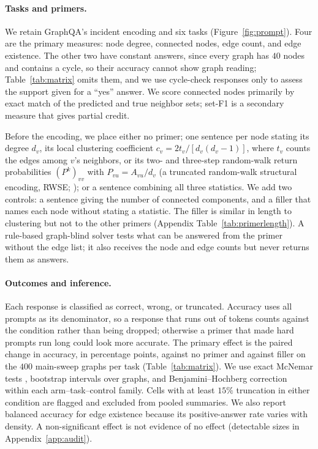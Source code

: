 \documentclass[11pt]{article}
\begin{document}
\paragraph{Tasks and primers.} We retain GraphQA's incident encoding and six tasks (Figure~\ref{fig:prompt}). Four are the primary measures: node degree, connected nodes, edge count, and edge existence. The other two have constant answers, since every graph has $40$ nodes and contains a cycle, so their accuracy cannot show graph reading; Table~\ref{tab:matrix} omits them, and we use cycle-check responses only to assess the support given for a ``yes'' answer. We score connected nodes primarily by exact match of the predicted and true neighbor sets; set-F1 is a secondary measure that gives partial credit. %

Before the encoding, we place either no primer; one sentence per node stating its degree $d_v$, its local clustering coefficient $c_v=2t_v/[d_v(d_v-1)]$, where $t_v$ counts the edges among $v$'s neighbors, or its two- and three-step random-walk return probabilities $(P^k)_{vv}$ with $P_{vu}=A_{vu}/d_v$ (a truncated random-walk structural encoding, RWSE; \citealp{dwivedi2022graph,rampasek2022recipe}); or a sentence combining all three statistics. We add two controls: a sentence giving the number of connected components, and a filler that names each node without stating a statistic. The filler is similar in length to clustering but not to the other primers (Appendix Table~\ref{tab:primerlength}). A rule-based graph-blind solver tests what can be answered from the primer without the edge list; it also receives the node and edge counts but never returns them as answers.

\paragraph{Outcomes and inference.} Each response is classified as correct, wrong, or truncated. Accuracy uses all prompts as its denominator, so a response that runs out of tokens counts against the condition rather than being dropped; otherwise a primer that made hard prompts run long could look more accurate. The primary effect is the paired change in accuracy, in percentage points, against no primer and against filler on the $400$ main-sweep graphs per task (Table~\ref{tab:matrix}). We use exact McNemar tests \citep{mcnemar1947note}, bootstrap intervals over graphs, and Benjamini--Hochberg correction \citep{benjaminihochberg1995controlling} within each arm--task--control family. Cells with at least $15\%$ truncation in either condition are flagged and excluded from pooled summaries. We also report balanced accuracy for edge existence because its positive-answer rate varies with density. A non-significant effect is not evidence of no effect (detectable sizes in Appendix~\ref{app:audit}).
\end{document}
